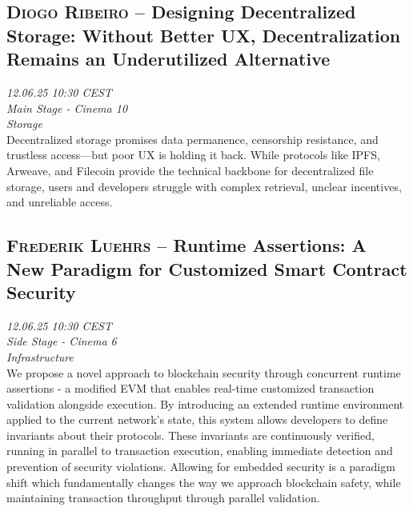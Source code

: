 \clearpage
\subsection {\textsc{Diogo Ribeiro}  -- Designing Decentralized Storage: Without Better UX, Decentralization Remains an Underutilized Alternative} \noindent \textit {12.06.25 10:30 CEST\\ Main Stage - Cinema 10\\ Storage}\\[1em] Decentralized storage promises data permanence, censorship resistance, and trustless access—but poor UX is holding it back. While protocols like IPFS, Arweave, and Filecoin provide the technical backbone for decentralized file storage, users and developers struggle with complex retrieval, unclear incentives, and unreliable access.

\clearpage
\subsection {\textsc{Frederik Luehrs}  -- Runtime Assertions: A New Paradigm for Customized Smart Contract Security} \noindent \textit {12.06.25 10:30 CEST\\ Side Stage - Cinema 6\\ Infrastructure}\\[1em] We propose a novel approach to blockchain security through concurrent runtime assertions - a modified EVM that enables real-time customized transaction validation alongside execution.
By introducing an extended runtime environment applied to the current network's state, this system allows developers to define invariants about their protocols. These invariants are continuously verified, running in parallel to transaction execution, enabling immediate detection and prevention of security violations.
Allowing for embedded security is a paradigm shift which fundamentally changes the way we approach blockchain safety, while maintaining transaction throughput through parallel validation.

\clearpage
